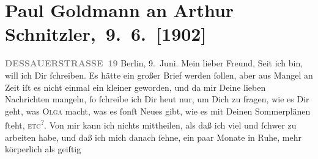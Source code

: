 

         
         \renewcommand{\erwaehntePersonen}{Personen: Olga Schnitzler}
         \renewcommand{\erwaehnteOrte}{Orte: Berlin, Dessauer Straße, Wien}
         \renewcommand{\erwaehnteWerke}{}
               \section[ Paul Goldmann an Arthur Schnitzler, 9. 6. {[}1902{]}]{ Paul Goldmann an Arthur Schnitzler, 9. 6. {[}1902{]}}\nopagebreak{}\rehead{ }\begin{ledgroupsized}[t]{13cm}\normalsize\beginnumbering \toendnotes[C]{\smallbreak\pagebreak[2]} 
\toendnotes[C]{\smallbreak}\pstart
           \noindent{}\raggedleft{}{\pb}\textcolor{gray}{\textbf{DESSAUERSTRASSE 19}}\pend
           \pstart
           Berlin, 9. Juni.\pend
           \pstart\center{}Mein lieber Freund,\pend\pstart
           Seit ich \label{K_L03210-1v}\label{K_L03210-1h} bin, will ich Dir ſchreiben.
               Es hätte ein großer Brief werden ſollen, aber aus Mangel an Zeit iſt es nicht einmal
               ein kleiner geworden, und da mir Deine lieben Nachrichten mangeln, ſo ſchreibe ich
               Dir heut nur, um Dich zu fragen, wie es Dir geht, was
                  \textsc{Olga} macht, was {\pb}es ſonſt Neues gibt, wie es mit
               Deinen Sommerplänen ſteht, \textsc{etc}\substVorne{}\textsuperscript{?}\substDazwischen{}.\substHinten{}\pend
           \pstart
           Von mir kann ich nichts mittheilen, als daß ich viel und ſchwer zu arbeiten habe, und
               daß ich mich danach ſehne, ein paar Monate in Ruhe, mehr körperlich als geiſtig

\end{ledgroupsized}
